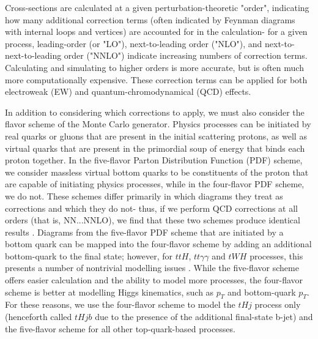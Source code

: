 Cross-sections are calculated at a given perturbation-theoretic "order", indicating how many additional correction terms (often indicated by Feynman diagrams with internal loops and vertices) are accounted for in the calculation- for a given process, leading-order (or "LO"), next-to-leading order ("NLO"), and next-to-next-to-leading order ("NNLO") indicate increasing numbers of correction terms. Calculating and simulating to higher orders is more accurate, but is often much more computationally expensive. These correction terms can be applied for both electroweak (EW) and quantum-chromodynamical (QCD) effects.

In addition to considering which corrections to apply, we must also consider the flavor scheme of the Monte Carlo generator. Physics processes can be initiated by real quarks or gluons that are present in the initial scattering protons, as well as virtual quarks that are present in the primordial soup of energy that binds each proton together. In the five-flavor Parton Distribution Function (PDF) scheme, we consider massless virtual bottom quarks to be constituents of the proton that are capable of initiating physics processes, while in the four-flavor PDF scheme, we do not. These schemes differ primarily in which diagrams they treat as corrections and which they do not- thus, if we perform QCD corrections at all orders (that is, NN...NNLO), we find that these two schemes produce identical results \cite{FedericotH}. Diagrams from the five-flavor PDF scheme that are initiated by a bottom quark can be mapped into the four-flavor scheme by adding an additional bottom-quark to the final state; however, for $ttH$, $tt\gamma\gamma$ and $tWH$ processes, this presents a number of nontrivial modelling issues \cite{FedericotWH}. While the five-flavor scheme offers easier calculation and the ability to model more processes, the four-flavor scheme is better at modelling Higgs kinematics, such as $p_{T}$ and bottom-quark  $p_{T}$. For these reasons, we use the four-flavor scheme to model the $tHj$ process only (henceforth called $tHjb$ due to the presence of the additional final-state b-jet) and the five-flavor scheme for all other top-quark-based processes. 

